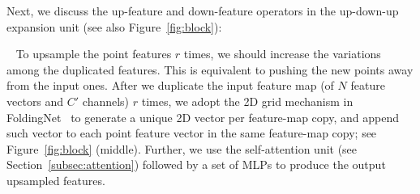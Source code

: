 


Next, we discuss the up-feature and down-feature operators in the up-down-up expansion unit (see also Figure~\ref{fig:block}):

 \
To upsample the point features $r$ times, we should increase the variations among the duplicated features.
This is equivalent to pushing the new points away from the input ones.
%
After we duplicate the input feature map (of $N$ feature vectors and $C'$ channels) $r$ times, we adopt the 2D grid mechanism in FoldingNet~\cite{yang2018foldingnet} to generate a unique 2D vector per feature-map copy, and append such vector to each point feature vector in the same feature-map copy; see Figure~\ref{fig:block} (middle).
%
Further, we use the self-attention unit (see Section~\ref{subsec:attention}) followed by a set of MLPs to produce the output upsampled features.

